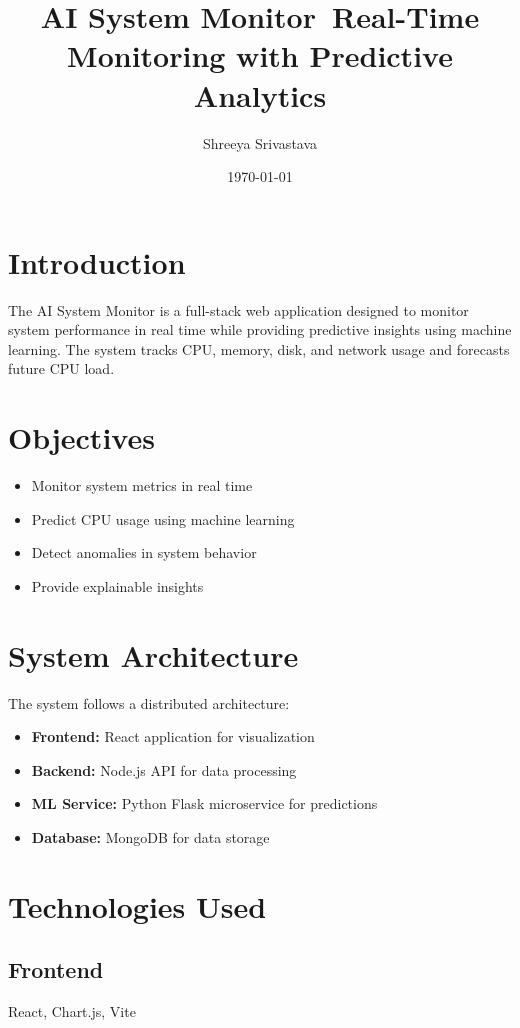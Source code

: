 \documentclass[12pt]{article}
\title{\textbf{AI System Monitor}\
\large Real-Time Monitoring with Predictive Analytics}
\author{Shreeya Srivastava}
\date{\today}
\begin{document}
\maketitle

\section{Introduction}
The AI System Monitor is a full-stack web application designed to monitor system performance in real time while providing predictive insights using machine learning. The system tracks CPU, memory, disk, and network usage and forecasts future CPU load.

\section{Objectives}
\begin{itemize}
\item Monitor system metrics in real time
\item Predict CPU usage using machine learning
\item Detect anomalies in system behavior
\item Provide explainable insights
\end{itemize}

\section{System Architecture}
The system follows a distributed architecture:

\begin{itemize}
\item \textbf{Frontend:} React application for visualization
\item \textbf{Backend:} Node.js API for data processing
\item \textbf{ML Service:} Python Flask microservice for predictions
\item \textbf{Database:} MongoDB for data storage
\end{itemize}

\section{Technologies Used}
\subsection{Frontend}
React, Chart.js, Vite
\end{document}
